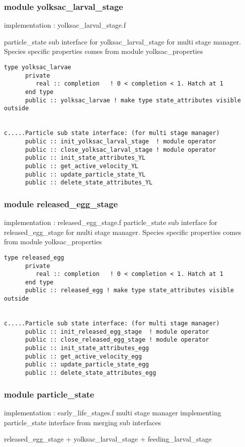 \subsubsection{module yolksac\_larval\_stage}                     implementation : yolksac\_larval\_stage.f

particle\_state sub interface for yolksac\_larval\_stage for
multi stage manager. Species specific properties comes from 
module yolksac\_properties     

\begin{verbatim}
type yolksac_larvae
      private
         real :: completion   ! 0 < completion < 1. Hatch at 1
      end type
      public :: yolksac_larvae ! make type state_attributes visible outside


c.....Particle sub state interface: (for multi stage manager)
      public :: init_yolksac_larval_stage  ! module operator
      public :: close_yolksac_larval_stage ! module operator
      public :: init_state_attributes_YL
      public :: get_active_velocity_YL
      public :: update_particle_state_YL
      public :: delete_state_attributes_YL
\end{verbatim}


\subsubsection{module released\_egg\_stage}                        
implementation : released\_egg\_stage.f
particle\_state sub interface for released\_egg\_stage for
multi stage manager. Species specific properties comes from 
module yolksac\_properties     


\begin{verbatim}
type released_egg
      private
         real :: completion   ! 0 < completion < 1. Hatch at 1
      end type
      public :: released_egg ! make type state_attributes visible outside


c.....Particle sub state interface: (for multi stage manager)
      public :: init_released_egg_stage  ! module operator
      public :: close_released_egg_stage ! module operator
      public :: init_state_attributes_egg
      public :: get_active_velocity_egg
      public :: update_particle_state_egg
      public :: delete_state_attributes_egg

\end{verbatim}

\subsubsection{module particle\_state}                             
implementation : early\_life\_stages.f
multi stage manager implementing particle\_state interface 
from merging sub interfaces

released\_egg\_stage + yolksac\_larval\_stage + feeding\_larval\_stage  




